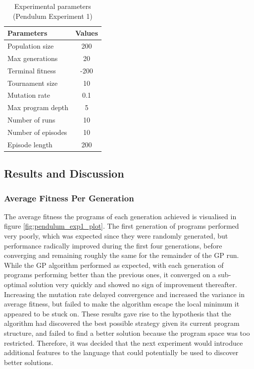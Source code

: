 \begin{table}[ht]
    \centering
    \begin{tabular}{|l|c|}
        \hline
        \textbf{Parameters} & \textbf{Values} \\
        \hline
        Population size     & 200  \\
        Max generations     & 20   \\
        Terminal fitness & -200 \\
        Tournament size     & 10   \\
        Mutation rate       & 0.1  \\
        Max program depth   & 5    \\
        Number of runs      & 10   \\
        Number of episodes  & 10   \\
        Episode length      & 200  \\
        \hline
    \end{tabular}
    \caption{Experimental parameters (Pendulum Experiment 1)}
    \label{tab:pendulum_exp1_params}
\end{table}

\subsection{Results and Discussion}
\subsubsection{Average Fitness Per Generation}
The average fitness the programs of each generation achieved is visualised in figure \ref{fig:pendulum_exp1_plot}. The first generation of programs performed very poorly, which was expected since they were randomly generated, but performance radically improved during the first four generations, before converging and remaining roughly the same for the remainder of the GP run. While the GP algorithm performed as expected, with each generation of programs performing better than the previous ones, it converged on a sub-optimal solution very quickly and showed no sign of improvement thereafter. Increasing the mutation rate delayed convergence and increased the variance in average fitness, but failed to make the algorithm escape the local minimum it appeared to be stuck on. These results gave rise to the hypothesis that the algorithm had discovered the best possible strategy given its current program structure, and failed to find a better solution because the program space was too restricted. Therefore, it was decided that the next experiment would introduce additional features to the language that could potentially be used to discover better solutions.

